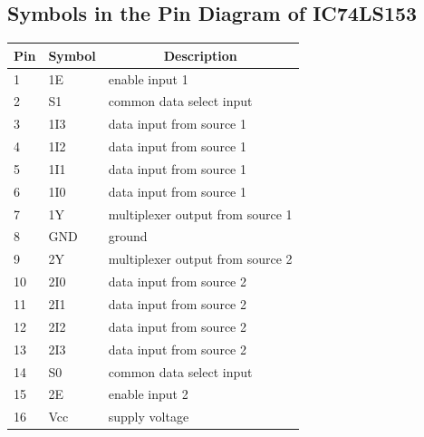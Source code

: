 \documentclass[11pt]{article}
\begin{document}
\subsection{Symbols in the Pin Diagram of IC74LS153}
\begin{table}[H]
	\begin{tabular}{|l|l|l|}
		\hline
		\multicolumn{1}{|c|}{\textbf{Pin}} & \multicolumn{1}{c|}{\textbf{Symbol}} & \multicolumn{1}{c|}{\textbf{Description}} \\ \hline
		1                                  & 1E                                   & enable input 1                            \\ \hline
		2                                  & S1                                   & common data select input                  \\ \hline
		3                                  & 1I3                                  & data input from source 1                  \\ \hline
		4                                  & 1I2                                  & data input from source 1                  \\ \hline
		5                                  & 1I1                                  & data input from source 1                  \\ \hline
		6                                  & 1I0                                  & data input from source 1                  \\ \hline
		7                                  & 1Y                                   & multiplexer output from source 1          \\ \hline
		8                                  & GND                                  & ground                                    \\ \hline
		9                                  & 2Y                                   & multiplexer output from source 2          \\ \hline
		10                                 & 2I0                                  & data input from source 2                  \\ \hline
		11                                 & 2I1                                  & data input from source 2                  \\ \hline
		12                                 & 2I2                                  & data input from source 2                  \\ \hline
		13                                 & 2I3                                  & data input from source 2                  \\ \hline
		14                                 & S0                                   & common data select input                  \\ \hline
		15                                 & 2E                                   & enable input 2                            \\ \hline
		16                                 & Vcc                                  & supply voltage                            \\ \hline
	\end{tabular}
\end{table}
\pagebreak
\end{document}
